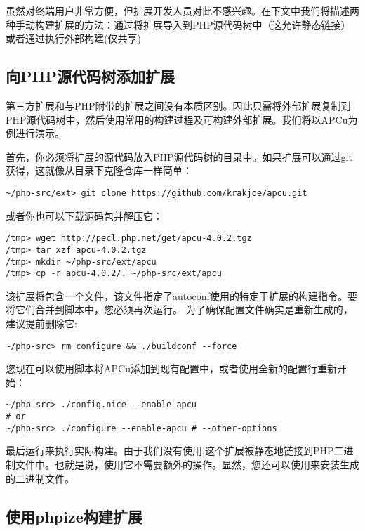 虽然对终端用户非常方便，但扩展开发人员对此不感兴趣。在下文中我们将描述两种手动构建扩展的方法：通过将扩展导入到PHP源代码树中（这允许静态链接）或者通过执行外部构建(仅共享)


\subsection{向PHP源代码树添加扩展}

第三方扩展和与PHP附带的扩展之间没有本质区别。因此只需将外部扩展复制到PHP源代码树中，然后使用常用的构建过程及可构建外部扩展。我们将以APCu为例进行演示。

首先，你必须将扩展的源代码放入PHP源代码树的目录中。如果扩展可以通过git获得，这就像从目录下克隆仓库一样简单：

\begin{lstlisting}[language=shell]
~/php-src/ext> git clone https://github.com/krakjoe/apcu.git
\end{lstlisting}

或者你也可以下载源码包并解压它：
\begin{lstlisting}[language=shell]
/tmp> wget http://pecl.php.net/get/apcu-4.0.2.tgz
/tmp> tar xzf apcu-4.0.2.tgz
/tmp> mkdir ~/php-src/ext/apcu
/tmp> cp -r apcu-4.0.2/. ~/php-src/ext/apcu
\end{lstlisting}

该扩展将包含一个文件，该文件指定了autoconf使用的特定于扩展的构建指令。要将它们合并到脚本中，您必须再次运行。 为了确保配置文件确实是重新生成的，建议提前删除它:

\begin{lstlisting}[language=shell]
~/php-src> rm configure && ./buildconf --force
\end{lstlisting}

您现在可以使用脚本将APCu添加到现有配置中，或者使用全新的配置行重新开始：

\begin{lstlisting}[language=shell]
~/php-src> ./config.nice --enable-apcu
# or
~/php-src> ./configure --enable-apcu # --other-options
\end{lstlisting}

最后运行来执行实际构建。由于我们没有使用,这个扩展被静态地链接到PHP二进制文件中。也就是说，使用它不需要额外的操作。显然，您还可以使用来安装生成的二进制文件。

\subsection{使用phpize构建扩展}

